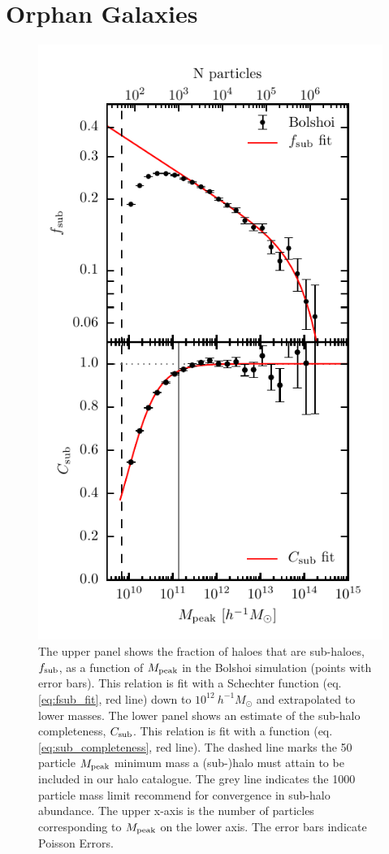 \documentclass[a4paper,fleqn,usenatbib]{mnras}
\begin{document}
\section{Orphan Galaxies}
\label{sec:orphans}

\begin{figure}
    \includegraphics{figures/sub_fraction_and_completeness.pdf}
    \caption{The upper panel shows the fraction of haloes that are sub-haloes, $f_{\rm sub}$, as a function of $M_{\rm peak}$ in the Bolshoi simulation (points with error bars).  This relation is fit with a Schechter function (eq. \ref{eq:fsub_fit}, red line) down to $10^{12} ~ h^{-1}M_{\odot}$ and extrapolated to lower masses.  The lower panel shows an estimate of the sub-halo completeness, $C_{\rm sub}$.  This relation is fit with a function (eq. \ref{eq:sub_completeness}, red line).   The dashed line marks the 50 particle $M_{\rm peak}$ minimum mass a (sub-)halo must attain to be included in our halo catalogue.  The grey line indicates the 1000 particle mass limit \citet{Guo:2013fm} recommend for convergence in sub-halo abundance.  The upper x-axis is the number of particles corresponding to $M_{\rm peak}$ on the lower axis.  The error bars indicate Poisson Errors.}
    \label{fig:f_sub}
\end{figure}
\end{document}
